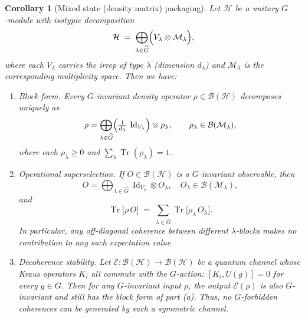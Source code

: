 \documentclass[12pt,a4paper]{article}
\newtheorem{corollary}{Corollary}
\begin{document}
\begin{corollary}[Mixed state (density matrix) packaging]
	\label{COR:DensityMatrixPackaging}
	Let $\mathcal H$ be a unitary $G$‐module with isotypic decomposition
	\[
	\mathcal H
	\;=\;
	\bigoplus_{\lambda \in \widehat G}
	\Bigl(V_\lambda \otimes \mathcal M_\lambda\Bigr),
	\]
	where each $V_\lambda$ carries the irrep of type $\lambda$ (dimension $d_\lambda$) and $\mathcal M_\lambda$ is the corresponding multiplicity space.
	Then we have:
	
	\begin{enumerate}[label=(\alph*)]
		\item \emph{Block form.}
		Every $G$-invariant density operator $\rho \in \mathcal B(\mathcal H)$ decomposes uniquely as
		\[
		\rho =
		\bigoplus_{\lambda\in\widehat G}
		\Bigl(\tfrac1{d_\lambda}\,\operatorname{Id}_{V_\lambda}\Bigr)
		\otimes
		\rho_\lambda,
		\qquad
		\rho_\lambda \in \mathcal B(\mathcal M_\lambda),
		\]
		where each $\rho_\lambda\ge0$ and $\sum_\lambda \operatorname{Tr}(\rho_\lambda)=1$.
		
		\item \emph{Operational superselection.}
		If $O \in \mathcal B(\mathcal H)$ is a $G$-invariant observable, then
		\[
		O =
		\bigoplus_{\lambda \in \widehat G}
		\operatorname{Id}_{V_\lambda} \otimes O_\lambda,
		\quad
		O_\lambda\in \mathcal B(\mathcal M_\lambda),
		\]
		and
		\[
		\operatorname{Tr} \bigl[\rho\,O\bigr]
		\;=\;
		\sum_{\lambda\in\widehat G}
		\operatorname{Tr}\bigl[\rho_\lambda\,O_\lambda\bigr].
		\]
		In particular, any off‐diagonal coherence between different $\lambda$-blocks makes no contribution to any such expectation value.
		
		\item \emph{Decoherence stability.}
		Let $\mathcal E: \mathcal B(\mathcal H) \to \mathcal B(\mathcal H)$ be a quantum channel whose Kraus operators $K_i$ all commute with the $G$-action: $[K_i, U(g)]=0$ for every $g \in G$.
		Then for any $G$-invariant input $\rho$, the output $\mathcal E(\rho)$ is also $G$-invariant and still has the block form of part (a).
		Thus, no $G$-forbidden coherences can be generated by such a symmetric channel.
	\end{enumerate}
\end{corollary}
\end{document}
